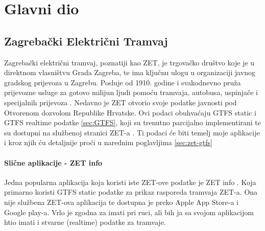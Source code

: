 \documentclass[zavrsnirad]{fer}
\begin{document}



\chapter{Glavni dio}
\label{pog:glavni_dio}

\section{Zagrebački Električni Tramvaj}

Zagrebački električni tramvaj, poznatiji kao ZET, je trgovačko društvo koje je u direktnom
vlasništvu Grada Zagreba, te ima ključnu ulogu u organizaciji javnog gradskog prijevoza u Zagrebu.
Posluje od 1910. godine i svakodnevno pruža prijevozne usluge za gotovo milijun ljudi pomoću
tramvaja, autobusa, uspinjače i specijalnih prijevoza \cite{ZET}.
Nedavno je ZET otvorio svoje podatke javnosti pod Otvorenom dozvolom Republike Hrvatske. Ovi podaci obuhvaćaju GTFS static i GTFS realtime podatke \ref{sec:GTFS}, koji su trenutno parcijalno implementirani te su dostupni na službenoj stranici ZET-a \cite{ZET-GTFS}.
Ti podaci će biti temelj moje aplikacije i kroz njih ću detaljnije proći u narednim poglavljima \ref{sec:zet-gtfs}

\subsubsection{Slične aplikacije - ZET info}
Jedna popularna aplikacija koja koristi iste ZET-ove podatke je ZET info \cite{ZET-info}. Koja primarno koristi GTFS static podatke za prikaz rasporeda tramvaja ZET-a. Ona nije službena ZET-ova aplikacija te dostupna je preko Apple App Store-a i Google play-a. Vrlo je zgodna za imati pri ruci, ali bih ja sa svojom aplikacijom htio imati i stvarne (realtime) podatke za tramvaje.
\end{document}
